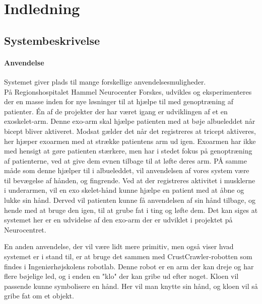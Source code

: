 \thispagestyle{fancy}
\chapter{Indledning}
\label{chp:indledning}

\section{Systembeskrivelse}
\subsubsection{Anvendelse}
Systemet giver plads til mange forskellige anvendelsesmuligheder.\\

På Regionshospitalet Hammel Neurocenter Forskes, udvikles og eksperimenteres der en masse inden for nye løsninger til at hjælpe til med genoptræning af patienter. Én af de projekter der har været igang er udviklingen af et en exoskelet-arm. Denne exo-arm skal hjælpe patienten med at bøje albueleddet når bicept bliver aktiveret. Modsat gælder det når det registreres at tricept aktiveres, her hjæper exoarmen med at strække patientens arm ud igen. Exoarmen har ikke med hensigt at gøre patienten stærkere, men har i stedet fokus på genoptræning af patienterne, ved at give dem evnen tilbage til at løfte deres arm. PÅ samme måde som denne hjælper til i albueleddet, vil anvendelsen af vores system være til bevægelse af hånden, og fingrende. Ved at der registreres aktivitet i musklerne i underarmen, vil en exo skelet-hånd kunne hjælpe en patient med at åbne og lukke sin hånd. Derved vil patienten kunne få anvendelsen af sin hånd tilbage, og hende med at bruge den igen, til at grube fat i ting og løfte dem. Det kan siges at systemet her er en udvidelse af den exo-arm der er udviklet i projektet på Neurocentret.

En anden anvendelse, der vil være lidt mere primitiv, men også viser hvad systemet er i stand til, er at bruge det sammen med CrustCrawler-robotten som findes i Ingeniørhøjskolens robotlab. Denne robot er en arm der kan dreje og har flere bøjelige led, og i enden en "klo" der kan gribe ud efter noget. Kloen vil passende kunne symbolisere en hånd. Her vil man knytte sin hånd, og kloen vil så gribe fat om et objekt.